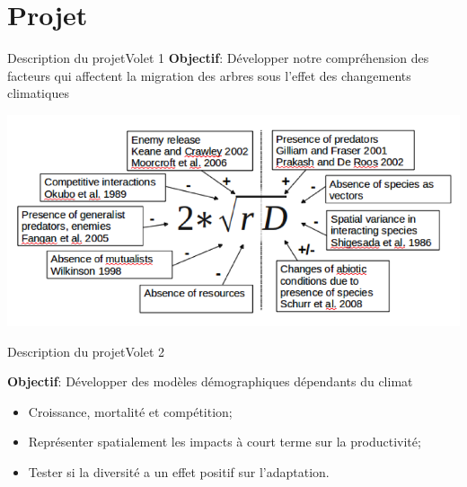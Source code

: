 \documentclass{eecslides}
\begin{document}
	\section{Projet}
%	
	\begin{frame}{Description du projet}{Volet 1}
		\textbf{Objectif}: Développer notre compréhension des facteurs qui affectent la migration des arbres sous l'effet des changements climatiques

		\begin{center}
			\includegraphics[height=0.5\textheight]{svenning.png}
		\end{center}

	\end{frame}
%
	
	\begin{frame}{Description du projet}{Volet 2}

	\textbf{Objectif}: Développer des modèles démographiques dépendants du climat

		\begin{itemize}
			\item Croissance, mortalité et compétition;  
			\item Représenter spatialement les impacts à court terme sur la productivité;
			\item Tester si la diversité a un effet positif sur l'adaptation. 
		\end{itemize}
		
	\end{frame}

	
\end{document}
